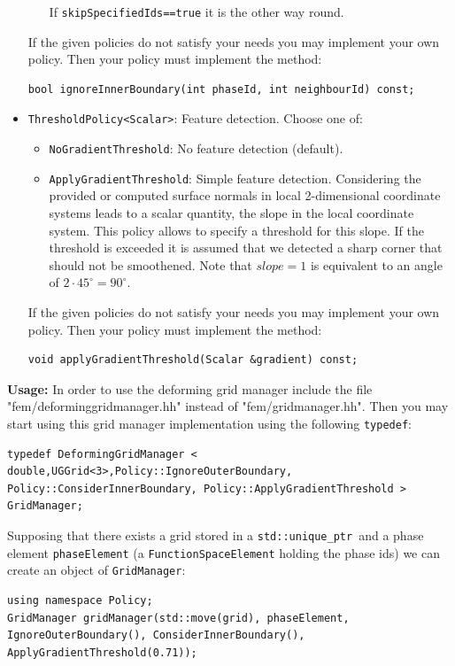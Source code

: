 \documentclass[11pt]{article}
\newcommand{\uniqueptr}{{\tt std::unique\_ptr}}
\begin{document}
\begin{itemize}
\begin{itemize}
If \verb+skipSpecifiedIds==true+ it is the other way round.
\end{itemize}
If the given policies do not satisfy your needs you may implement your own policy. Then your policy must implement the method: \\
\begin{lstlisting}
bool ignoreInnerBoundary(int phaseId, int neighbourId) const;
\end{lstlisting}
\item \verb+ThresholdPolicy<Scalar>+: Feature detection. Choose one of:
\begin{itemize}
\item \verb+NoGradientThreshold+: No feature detection (default).
\item \verb+ApplyGradientThreshold+: Simple feature detection. Considering the provided or computed surface normals in local 2-dimensional coordinate systems leads to a scalar quantity, the slope in the local coordinate system. This policy allows to specify a threshold for this slope. If the threshold is exceeded it is assumed that we detected a sharp corner that should not be smoothened. 
Note that $slope=1$ is equivalent to an angle of $2 \cdot 45^\circ=90^\circ$.
\end{itemize}
If the given policies do not satisfy your needs you may implement your own policy. Then your policy must implement the method: 
\begin{lstlisting}
void applyGradientThreshold(Scalar &gradient) const;
\end{lstlisting}
\end{itemize}


\noindent \textbf{Usage:} In order to use the deforming grid manager include the file "fem/deforminggridmanager.hh" instead of "fem/gridmanager.hh".
Then you may start using this grid manager implementation using the following \verb+typedef+:
\begin{lstlisting}
typedef DeformingGridManager < double,UGGrid<3>,Policy::IgnoreOuterBoundary,  Policy::ConsiderInnerBoundary, Policy::ApplyGradientThreshold > GridManager;
\end{lstlisting}
Supposing that there exists a grid stored in a \uniqueptr\ and a phase element \verb+phaseElement+ (a \verb+FunctionSpaceElement+ holding the phase ids) we can create an object of \verb+GridManager+:
\begin{lstlisting}
using namespace Policy;
GridManager gridManager(std::move(grid), phaseElement, IgnoreOuterBoundary(), ConsiderInnerBoundary(), ApplyGradientThreshold(0.71));
\end{lstlisting}
\end{document}
